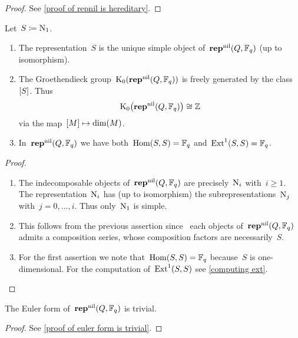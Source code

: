 \documentclass[a4paper,11pt]{scrartcl}
\begin{document}
\begin{proof}
  See \cref{proof of repnil is hereditary}.
\end{proof}

\begin{lemma}
  Let~$S \coloneqq \mathrm{N}_1$.
  \begin{enumerate}
    \item
      The representation~$S$ is the unique simple object of~$\mathbf{rep}^{\mathrm{nil}}(Q, \mathbb{F}_q)$ (up to isomorphism).
    \item
      The Groethendieck group~$\operatorname{K}_0(\mathbf{rep}^{\mathrm{nil}}(Q, \mathbb{F}_q))$ is freely generated by the class~$[S]$.
      Thus
      \[
        \operatorname{K}_0\bigl( \mathbf{rep}^{\mathrm{nil}}(Q, \mathbb{F}_q) \bigr)
        \cong
        \mathbb{Z}
      \]
      via the map~$[M] \mapsto \dim(M)$.
    \item
      In~$\mathbf{rep}^{\mathrm{nil}}(Q, \mathbb{F}_q)$ we have both~$\operatorname{Hom}(S, S) = \mathbb{F}_q$ and~$\operatorname{Ext}^1(S,S) = \mathbb{F}_q$.
  \end{enumerate}
\end{lemma}

\begin{proof}
  \leavevmode
  \begin{enumerate}
    \item
      The indecomposable objects of~$\mathbf{rep}^{\mathrm{nil}}(Q, \mathbb{F}_q)$ are precisely~$\mathrm{N}_i$ with~$i \geq 1$.
      The representation~$\mathrm{N}_i$ has (up to isomorphism) the subrepresentations~$\mathrm{N}_j$ with~$j = 0, \dotsc, i$.
      Thus only~$\mathrm{N}_1$ is simple.
    \item
      This follows from the previous assertion since~ each objects of~$\mathbf{rep}^{\mathrm{nil}}(Q, \mathbb{F}_q)$ admits a composition series, whose composition factors are necessarily~$S$.
    \item      
      For the first assertion we note that~$\operatorname{Hom}(S, S) = \mathbb{F}_q$ because~$S$ is one-dimensional.      
      For the computation of~$\operatorname{Ext}^1(S,S)$ see \cref{computing ext}.
    \qedhere
  \end{enumerate}
\end{proof}

\begin{corollary}
  \label{euler form is trivial}
  The Euler form of~$\mathbf{rep}^{\mathrm{nil}}(Q, \mathbb{F}_q)$ is trivial.
\end{corollary}

\begin{proof}
  See \cref{proof of euler form is trivial}.
\end{proof}
\end{document}
